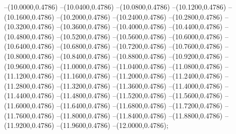 {	--(10.0000,0.4786)
	--(10.0400,0.4786)
	--(10.0800,0.4786)
	--(10.1200,0.4786)
	--(10.1600,0.4786)
	--(10.2000,0.4786)
	--(10.2400,0.4786)
	--(10.2800,0.4786)
	--(10.3200,0.4786)
	--(10.3600,0.4786)
	--(10.4000,0.4786)
	--(10.4400,0.4786)
	--(10.4800,0.4786)
	--(10.5200,0.4786)
	--(10.5600,0.4786)
	--(10.6000,0.4786)
	--(10.6400,0.4786)
	--(10.6800,0.4786)
	--(10.7200,0.4786)
	--(10.7600,0.4786)
	--(10.8000,0.4786)
	--(10.8400,0.4786)
	--(10.8800,0.4786)
	--(10.9200,0.4786)
	--(10.9600,0.4786)
	--(11.0000,0.4786)
	--(11.0400,0.4786)
	--(11.0800,0.4786)
	--(11.1200,0.4786)
	--(11.1600,0.4786)
	--(11.2000,0.4786)
	--(11.2400,0.4786)
	--(11.2800,0.4786)
	--(11.3200,0.4786)
	--(11.3600,0.4786)
	--(11.4000,0.4786)
	--(11.4400,0.4786)
	--(11.4800,0.4786)
	--(11.5200,0.4786)
	--(11.5600,0.4786)
	--(11.6000,0.4786)
	--(11.6400,0.4786)
	--(11.6800,0.4786)
	--(11.7200,0.4786)
	--(11.7600,0.4786)
	--(11.8000,0.4786)
	--(11.8400,0.4786)
	--(11.8800,0.4786)
	--(11.9200,0.4786)
	--(11.9600,0.4786)
	--(12.0000,0.4786);
}
